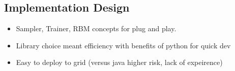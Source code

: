 \subsection{Implementation Design}

\begin{itemize}
  \item Sampler, Trainer, RBM concepts for plug and play.
  \item Library choice meant efficiency with benefits of python for quick dev
  \item Easy to deploy to grid (versus java higher risk, lack of expeirence)
\end{itemize}

%
%
